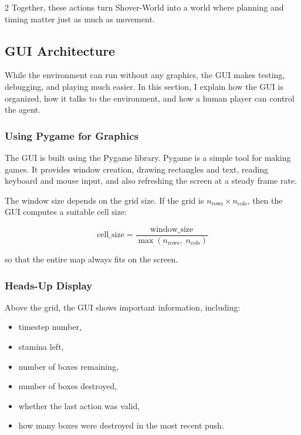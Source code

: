 \documentclass[a4paper]{article}
\begin{document}
\begin{multicols}{2}
Together, these actions turn Shover-World into a world where planning and timing matter just as much as movement.









\subsection{GUI Architecture}

While the environment can run without any graphics, the GUI makes testing, debugging, and playing much easier. In this section, I explain how the GUI is organized, how it talks to the environment, and how a human player can control the agent.

\subsubsection{Using Pygame for Graphics}

The GUI is built using the Pygame library. Pygame is a simple tool for making games. It provides window creation, drawing rectangles and text, reading keyboard and mouse input, and also refreshing the screen at a steady frame rate.


The window size depends on the grid size. If the grid is \(n_{\text{rows}}\times n_{\text{cols}}\), then the GUI computes a suitable cell size:

\[
\text{cell\_size} = 
\frac{\text{window\_size}}{\max(n_{\text{rows}},\; n_{\text{cols}})}
\]

so that the entire map always fits on the screen.


\subsubsection{Heads-Up Display}

Above the grid, the GUI shows important information, including:

\begin{itemize}[label=--]
    \item timestep number,
    \item stamina left,
    \item number of boxes remaining,
    \item number of boxes destroyed,
    \item whether the last action was valid,
    \item how many boxes were destroyed in the most recent push.
\end{itemize}


\end{multicols}
\end{document}
